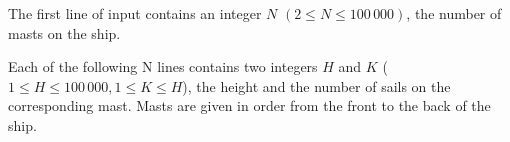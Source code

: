 The first line of input contains an integer $N$ $(2 \le N \le 100\,000)$, the number of masts on the ship.

Each of the following N lines contains two integers $H$ and $K$ ($1 \le H \le 100\,000, 1 \le K \le H$), the height and the number of sails on the corresponding mast. Masts are given in order from the front to the back of the ship.